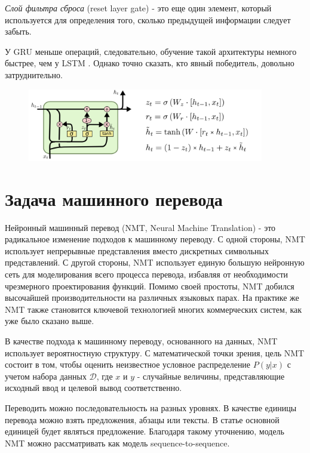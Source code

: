     \textit{Слой фильтра сброса} (reset layer gate) - это еще один элемент, который используется для определения того, сколько предыдущей информации следует забыть.
    
    У GRU меньше операций, следовательно, обучение такой архитектуры немного быстрее, чем у LSTM \cite{4}. Однако точно сказать, кто явный победитель, довольно затруднительно.
    
    \begin{figure}[ht!]
		\centering
		\captionsetup{justification=centering}
		\includegraphics[width=0.92\textwidth]{img/GRU.png}
	\end{figure}
	
	\clearpage
 	
	\section{Задача машинного перевода}
	
	Нейронный машинный перевод (NMT, Neural Machine Translation) - это радикальное изменение подходов к машинному переводу. С одной стороны, NMT использует непрерывные представления вместо дискретных символьных представлений. С другой стороны, NMT использует единую большую нейронную сеть для моделирования всего процесса перевода, избавляя от необходимости чрезмерного проектирования функций. Помимо своей простоты, NMT добился высочайшей производительности на различных языковых парах. На практике же NMT также становится ключевой технологией многих коммерческих систем, как уже было сказано выше.
	
	В качестве подхода к машинному переводу, основанного на данных, NMT использует вероятностную структуру. С математической точки зрения, цель NMT состоит в том, чтобы оценить неизвестное условное распределение $P(y|x)$ с учетом набора данных $\mathcal{D}$, где $x$ и $y$ - случайные величины, представляющие исходный ввод и целевой вывод соответственно.
	
    Переводить можно последовательность на разных уровнях. В качестве единицы перевода можно взять предложения, абзацы или тексты. В статье основной единицей будет являться предложение. Благодаря такому уточнению, модель NMT можно рассматривать как модель sequence-to-sequence. 
    
